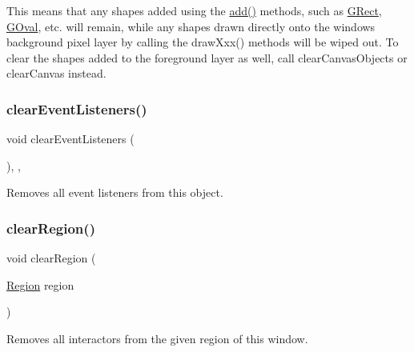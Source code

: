 This means that any shapes added using the \mbox{\hyperlink{classGWindow_a6f99b7c841256dbdc5acaafbbca4e685}{add()}} methods, such as \mbox{\hyperlink{classGRect}{G\+Rect}}, \mbox{\hyperlink{classGOval}{G\+Oval}}, etc. will remain, while any shapes drawn directly onto the window\textquotesingle{}s background pixel layer by calling the draw\+Xxx() methods will be wiped out. To clear the shapes added to the foreground layer as well, call clear\+Canvas\+Objects or clear\+Canvas instead. \mbox{\label{classGObservable_a80cfa040459ff53594adbd6a51ec8f43}} 
\subsubsection{\texorpdfstring{clear\+Event\+Listeners()}{clearEventListeners()}}
{\footnotesize\ttfamily void clear\+Event\+Listeners (\begin{DoxyParamCaption}{ }\end{DoxyParamCaption})\hspace{0.3cm}{\ttfamily [protected]}, {\ttfamily [virtual]}, {\ttfamily [inherited]}}



Removes all event listeners from this object. 

\mbox{\label{classGWindow_a47f0cc45498a78757fa4d0e6befc2981}} 
\subsubsection{\texorpdfstring{clear\+Region()}{clearRegion()}\hspace{0.1cm}{\footnotesize\ttfamily [1/2]}}
{\footnotesize\ttfamily void clear\+Region (\begin{DoxyParamCaption}\item[{\mbox{\hyperlink{classGWindow_a81a01a86de31071a92e6cce0bab9bc4b}{Region}}}]{region }\end{DoxyParamCaption})\hspace{0.3cm}{\ttfamily [virtual]}}



Removes all interactors from the given region of this window. 

